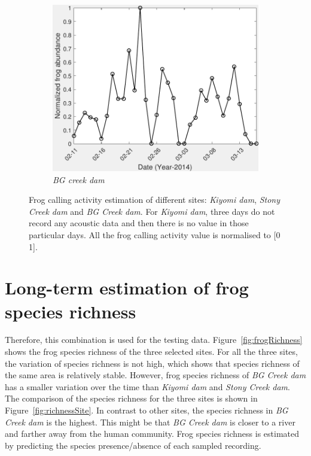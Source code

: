 \begin{figure}[htb!]
               ~
              \begin{subfigure}[b]{0.3\textwidth}
                \includegraphics[width=\textwidth]{image/Ch7/abundance1079.pdf}     
                \caption{\textit{BG creek dam}}           
        \end{subfigure}       
\caption[Frog calling activity detection of different sites]{Frog calling activity estimation of different sites: \textit{Kiyomi dam}, \textit{Stony Creek dam} and \textit{BG Creek dam}. For \textit{Kiyomi dam}, three days do not record any acoustic data and then there is no value in those particular days. All the frog calling activity value is normalised to [0 1].}
        \label{fig:frogAbundance}
\end{figure}



\section{Long-term estimation of frog species richness}

Therefore, this combination is used for the testing data. 
Figure~\ref{fig:frogRichness} shows the frog species richness of the three selected sites. For all the three sites, the variation of species richness is not high, which shows that species richness of the same area is relatively stable. However, frog species richness of \textit{BG Creek dam} has a smaller variation over the time than \textit{Kiyomi dam} and \textit{Stony Creek dam}. The comparison of the species richness for the three sites is shown in Figure~\ref{fig:richnessSite}. In contrast to other sites, the species richness in \textit{BG Creek dam} is the highest. This might be that \textit{BG Creek dam} is closer to a river and farther away from the human community.
Frog species richness is estimated by predicting the species presence/absence of each sampled recording. 


